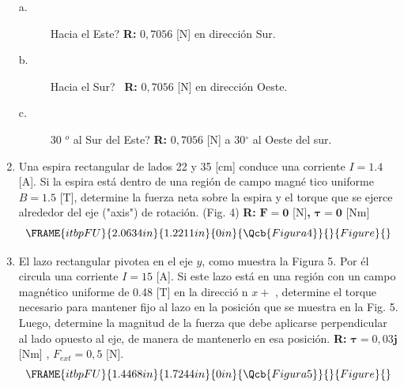 \documentclass[12pt]{article}
\begin{document}
\begin{enumerate}
\begin{description}
\item[a.] Hacia el Este? \textbf{R: }$0,7056$ [N] en direcci\'{o}n Sur.

\item[b.] Hacia el Sur? \ \textbf{R: }$0,7056$ [N] en direcci\'{o}n Oeste.

\item[c.] 30%
${{}^o}$
al Sur del Este? \textbf{R: }$0,7056$ [N] a 30$%
{{}^\circ}%
$ al Oeste del sur.
\end{description}

\item Una espira rectangular de lados 22 y 35 [cm] conduce una corriente $%
I=1.4$ [A]. Si la espira est\'{a} dentro de una regi\'{o}n de campo magn\'{e}%
tico uniforme $B=1.5$ [T], determine la fuerza neta sobre la espira y el
torque que se ejerce alrededor del eje ("axis") de rotaci\'{o}n. (Fig. 4) 
\textbf{R: }$\mathbf{F=0}$ [N]\textbf{, }$\mathbf{\tau =0}$ [Nm]%
\begin{equation*}
\FRAME{itbpFU}{2.0634in}{1.2211in}{0in}{\Qcb{Figura 4}}{}{Figure}{\special%
{language "Scientific Word";type "GRAPHIC";maintain-aspect-ratio
TRUE;display "USEDEF";valid_file "T";width 2.0634in;height 1.2211in;depth
0in;original-width 3.2093in;original-height 1.8896in;cropleft "0";croptop
"1";cropright "1";cropbottom "0";tempfilename
'R2D0SD03.wmf';tempfile-properties "XPR";}}
\end{equation*}

\item El lazo rectangular pivotea en el eje $y$, como muestra la Figura 5.
Por \'{e}l circula una corriente $I=15$ [A]. Si este lazo est\'{a} en una
regi\'{o}n con un campo magn\'{e}tico uniforme de 0.48 [T] en la direcci\'{o}%
n $x+$ , determine el torque necesario para mantener fijo al lazo en la
posici\'{o}n que se muestra en la Fig. 5. Luego, determine la magnitud de la
fuerza que debe aplicarse perpendicular al lado opuesto al eje, de manera de
mantenerlo en esa posici\'{o}n. \textbf{R: }$\mathbf{\tau }=0,03\mathbf{j}$
[Nm] , $F_{ext}=0,5$ [N].%
\begin{equation*}
\FRAME{itbpFU}{1.4468in}{1.7244in}{0in}{\Qcb{Figura 5}}{}{Figure}{\special%
{language "Scientific Word";type "GRAPHIC";maintain-aspect-ratio
TRUE;display "USEDEF";valid_file "T";width 1.4468in;height 1.7244in;depth
0in;original-width 3.3736in;original-height 4.0274in;cropleft "0";croptop
"1";cropright "1";cropbottom "0";tempfilename
'R2D0SD04.wmf';tempfile-properties "XPR";}}
\end{equation*}


\end{enumerate}
\end{document}
